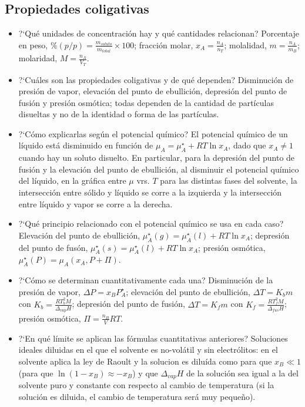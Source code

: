 \documentclass[a4paper,12pt]{article}
\begin{document}
\subsection*{Propiedades coligativas}

\begin{itemize}
 \item ?`Qu\'e unidades de concentración hay y qu\'e cantidades relacionan? Porcentaje en peso, $\%(p/p)=\frac{m_{soluto}}{m_{total}}\times 100$; fracci\'on molar, $x_A=\frac{n_A}{n_T}$; molalidad, $m=\frac{n_A}{m_B}$; molaridad, $M=\frac{n_A}{V_T}$.
 \item ?`Cu\'ales son las propiedades coligativas y de qu\'e dependen? Disminuci\'on de presi\'on de vapor, elevaci\'on del punto de ebullici\'on, depresi\'on del punto de fusi\'on y presi\'on osm\'otica; todas dependen de la cantidad de part\'iculas disueltas y no de la identidad o forma de las part\'iculas.
 \item ?`C\'omo explicarlas seg\'un el potencial qu\'imico? El potencial qu\'imico de un l\'iquido est\'a disminuido en funci\'on de $\mu_A=\mu_A^\star+RT\ln x_A$, dado que $x_A\neq 1$ cuando hay un soluto disuelto. En particular, para la depresi\'on del punto de fusi\'on y la elevaci\'on del punto de ebullici\'on, al disminuir el potencial qu\'imico del l\'iquido, en la gr\'afica entre $\mu$ vrs. $T$ para las distintas fases del solvente, la intersecci\'on entre s\'olido y l\'iquido se corre a la izquierda y la intersecci\'on entre l\'iquido y vapor se corre a la derecha.
 \item ?`Qu\'e principio relacionado con el potencial qu\'imico se usa en cada caso? Elevaci\'on del punto de ebullici\'on, $\mu_A^\star(g)=\mu_A^\star(l)+RT\ln x_A$; depresi\'on del punto de fus\'on, $\mu_A^\star(s)=\mu_A^\star(l)+RT\ln x_A$; presi\'on osm\'otica, $\mu_A^\star(P)=\mu_A(x_A,P+\Pi)$.
 \item ?`C\'omo se determinan cuantitativamente cada una? Disminuci\'on de la presi\'on de vapor, $\Delta P=x_BP_A^\star$; elevaci\'on del punto de ebullici\'on, $\Delta T=K_bm$ con $K_b=\frac{RT_b^2M}{\Delta_{vap}H}$; depresi\'on del punto de fusi\'on, $\Delta T=K_fm$ con $K_f=\frac{RT_f^2M}{\Delta_{fus}H}$; presi\'on osm\'otica, $\Pi=\frac{n_B}{V}RT$.
 \item ?`En qu\'e l\'imite se aplican las fórmulas cuantitativas anteriores? Soluciones ideales diluidas en el que el solvente es no-vol\'atil y sin electr\'olitos: en el solvente aplica la ley de Raoult y la solucion es dilu\'ida como para que $x_B\ll 1$ (para que $\ln (1-x_B)\approx -x_B$) y que $\Delta_{vap}H$ de la soluci\'on sea igual a la del solvente puro y constante con respecto al cambio de temperatura (si la soluci\'on es diluida, el cambio de temperatura ser\'a muy peque\~no).
\end{itemize}
\end{document}
